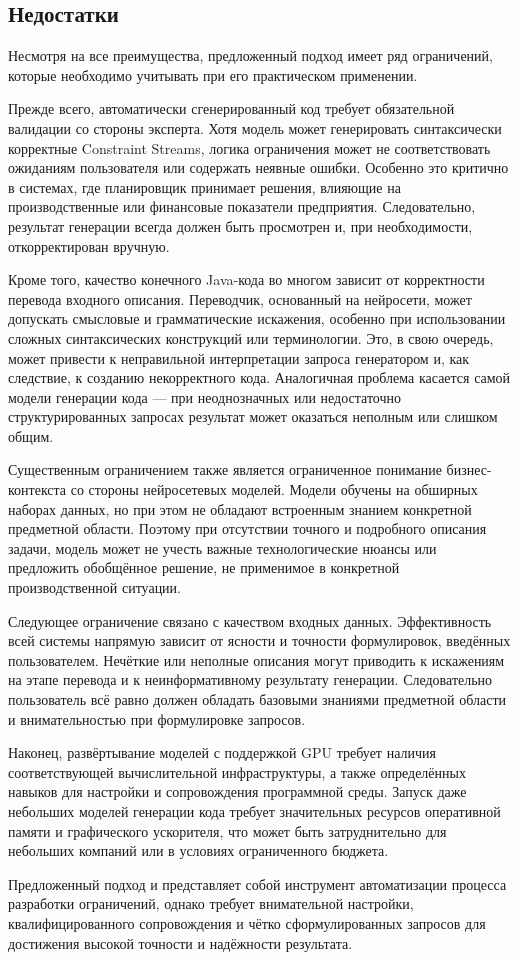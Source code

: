 \subsection{Недостатки}

Несмотря на все преимущества, предложенный подход имеет ряд ограничений, которые необходимо учитывать при его практическом применении.

Прежде всего, автоматически сгенерированный код требует обязательной валидации со стороны эксперта. Хотя модель может генерировать синтаксически корректные Constraint Streams, логика ограничения может не соответствовать ожиданиям пользователя или содержать неявные ошибки. Особенно это критично в системах, где планировщик принимает решения, влияющие на производственные или финансовые показатели предприятия. Следовательно, результат генерации всегда должен быть просмотрен и, при необходимости, откорректирован вручную.

Кроме того, качество конечного Java-кода во многом зависит от корректности перевода входного описания. Переводчик, основанный на нейросети, может допускать смысловые и грамматические искажения, особенно при использовании сложных синтаксических конструкций или терминологии. Это, в свою очередь, может привести к неправильной интерпретации запроса генератором и, как следствие, к созданию некорректного кода. Аналогичная проблема касается самой модели генерации кода — при неоднозначных или недостаточно структурированных запросах результат может оказаться неполным или слишком общим.

Существенным ограничением также является ограниченное понимание бизнес-контекста со стороны нейросетевых моделей. Модели обучены на обширных наборах данных, но при этом не обладают встроенным знанием конкретной предметной области. Поэтому при отсутствии точного и подробного описания задачи, модель может не учесть важные технологические нюансы или предложить обобщённое решение, не применимое в конкретной производственной ситуации.

Следующее ограничение связано с качеством входных данных. Эффективность всей системы напрямую зависит от ясности и точности формулировок, введённых пользователем. Нечёткие или неполные описания могут приводить к искажениям на этапе перевода и к неинформативному результату генерации. Следовательно пользователь всё равно должен обладать базовыми знаниями предметной области и внимательностью при формулировке запросов.

Наконец, развёртывание моделей с поддержкой GPU требует наличия соответствующей вычислительной инфраструктуры, а также определённых навыков для настройки и сопровождения программной среды. Запуск даже небольших моделей генерации кода требует значительных ресурсов оперативной памяти и графического ускорителя, что может быть затруднительно для небольших компаний или в условиях ограниченного бюджета.

Предложенный подход и представляет собой инструмент автоматизации процесса разработки ограничений, однако требует внимательной настройки, квалифицированного сопровождения и чётко сформулированных запросов для достижения высокой точности и надёжности результата.



